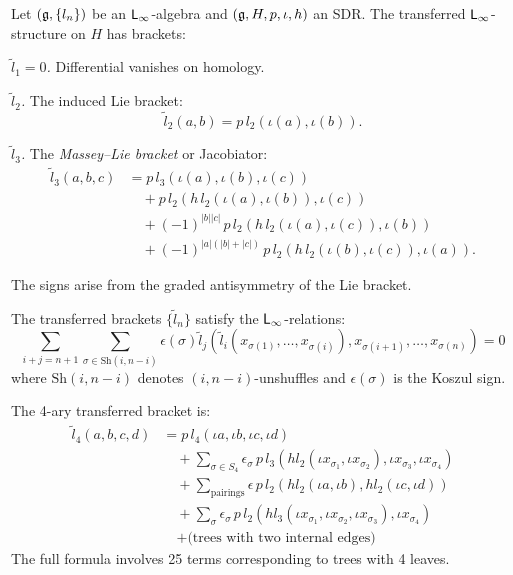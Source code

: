 \begin{construction}
\label{constr:htt-linf}
Let $(\mathfrak{g}, \{l_n\})$ be an $\mathsf{L}_{\infty}$-algebra and $(\mathfrak{g}, H, p, \iota, h)$ an SDR. 
The transferred $\mathsf{L}_{\infty}$-structure on $H$ has brackets:

\emph{$\tilde{l}_1 = 0$.} Differential vanishes on homology.

\emph{$\tilde{l}_2$.} The induced Lie bracket:
\[
\tilde{l}_2(a, b) = p \, l_2(\iota(a), \iota(b)).
\]

\emph{$\tilde{l}_3$.} The \emph{Massey--Lie bracket} or Jacobiator:
\begin{align*}
\tilde{l}_3(a, b, c) &= p \, l_3(\iota(a), \iota(b), \iota(c)) \\
&\quad + p \, l_2(h \, l_2(\iota(a), \iota(b)), \iota(c)) \\
&\quad + (-1)^{|b||c|} \, p \, l_2(h \, l_2(\iota(a), \iota(c)), \iota(b)) \\
&\quad + (-1)^{|a|(|b|+|c|)} \, p \, l_2(h \, l_2(\iota(b), \iota(c)), \iota(a)).
\end{align*}

The signs arise from the graded antisymmetry of the Lie bracket.
\end{construction}

\begin{proposition}
\label{prop:linf-relations}
The transferred brackets $\{\tilde{l}_n\}$ satisfy the $\mathsf{L}_{\infty}$-relations:
\[
\sum_{i+j = n+1} \sum_{\sigma \in \mathrm{Sh}(i, n-i)} \epsilon(\sigma) 
\tilde{l}_j(\tilde{l}_i(x_{\sigma(1)}, \ldots, x_{\sigma(i)}), x_{\sigma(i+1)}, \ldots, x_{\sigma(n)}) = 0
\]
where $\mathrm{Sh}(i, n-i)$ denotes $(i, n-i)$-unshuffles and $\epsilon(\sigma)$ 
is the Koszul sign.
\end{proposition}

\begin{computation}
\label{comp:l4-formula}
The 4-ary transferred bracket is:
\begin{align*}
\tilde{l}_4(a, b, c, d) &= p \, l_4(\iota a, \iota b, \iota c, \iota d) \\
&\quad + \sum_{\sigma \in S_4} \epsilon_\sigma \, p \, l_3(h l_2(\iota x_{\sigma_1}, \iota x_{\sigma_2}), \iota x_{\sigma_3}, \iota x_{\sigma_4}) \\
&\quad + \sum_{\text{pairings}} \epsilon \, p \, l_2(h l_2(\iota a, \iota b), h l_2(\iota c, \iota d)) \\
&\quad + \sum_{\sigma} \epsilon_\sigma \, p \, l_2(h l_3(\iota x_{\sigma_1}, \iota x_{\sigma_2}, \iota x_{\sigma_3}), \iota x_{\sigma_4}) \\
&\quad + \text{(trees with two internal edges)}
\end{align*}
The full formula involves 25 terms corresponding to trees with 4 leaves.
\end{computation}

